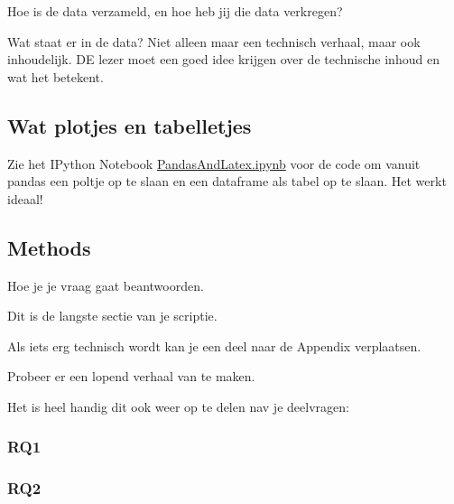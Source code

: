 Hoe is de data verzameld, en hoe heb jij die data verkregen?


Wat staat er in de data? Niet alleen maar een technisch verhaal, maar ook inhoudelijk. DE lezer moet een goed idee krijgen over de technische inhoud en wat het betekent.

\newpage


\pagebreak
\subsection{Wat plotjes en tabelletjes}

Zie het IPython Notebook \url{PandasAndLatex.ipynb} voor de code om vanuit pandas een poltje op te slaan en een dataframe als tabel op te slaan. Het werkt ideaal! 






\pagebreak


%

%		

\pagebreak
\subsection{Methods}
Hoe je je vraag gaat beantwoorden.


Dit is de langste sectie van je scriptie. 

Als iets erg technisch wordt kan je een deel naar de Appendix verplaatsen. 

Probeer er een lopend verhaal van te maken.

Het is heel handig dit ook weer op te delen nav je deelvragen:

\subsubsection{RQ1}

\subsubsection{RQ2}
\fi
